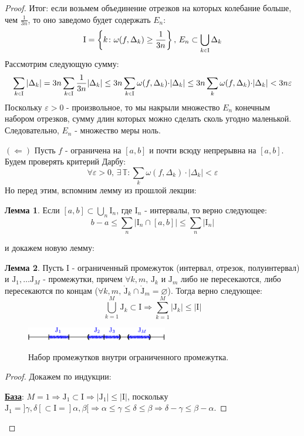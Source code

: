 \documentclass[12pt]{article}
\newcommand{\MTB}{\mathbb{T}}
\newcommand{\MI}{\mathrm{I}}
\newcommand{\MJ}{\mathrm{J}}
\newcommand{\VN}{\varnothing}
\newcommand{\VE}{\varepsilon}
\theoremstyle{definition}
\newtheorem{lemma}{Лемма}
\newcommand{\smallerrel}[1]{\mathrel{\mathpalette\smallerrelaux{#1}}}
\newcommand{\smallerrelaux}[2]{\raisebox{.1ex}{\scalebox{.75}{$#1#2$}}}
\newcommand{\smallin}{\smallerrel{\in}}
\begin{document}
\begin{proof}
	Итог: если возьмем объединение отрезков на которых колебание больше, чем $\tfrac{1}{3n}$, то оно заведомо будет содержать $E_n$:
	$$
		\MI = \left\{k\colon \omega(f,\Delta_k) \geq \dfrac{1}{3n}\right\}, \, E_n \subset \bigcup\limits_{k\smallin \MI}\Delta_k
	$$
	Рассмотрим следующую сумму:
	$$
		\sum\limits_{k \smallin \MI}|\Delta_k| = 3n \sum\limits_{k \smallin \MI}\dfrac{1}{3n}|\Delta_k| \leq 3n \sum\limits_{k \smallin \MI}\omega(f,\Delta_k){\cdot}|\Delta_k| \leq 3n \sum\limits_{k }\omega(f,\Delta_k){\cdot}|\Delta_k| < 3n\VE
	$$
	Поскольку $\VE > 0$ - произвольное, то мы накрыли множество $E_n$ конечным набором отрезков, сумму длин которых можно сделать сколь угодно маленькой. Следовательно, $E_n$ - множество меры ноль.
	
	$(\Leftarrow)$ Пусть $f$ - ограничена на $[a,b]$ и почти всюду непрерывна на $[a,b]$. Будем проверять критерий Дарбу:
	$$
		\forall \VE > 0, \, \exists \, \MTB \colon \sum\limits_{k}\omega(f,\Delta_k){\cdot}|\Delta_k| < \VE
	$$
	Но перед этим, вспомним лемму из прошлой лекции:
	\begin{lemma}
		Если $[a,b] \subset \displaystyle \bigcup\limits_n \MI_n$, где $\MI_n$ - интервалы, то верно следующее: 
		$$
			b - a \leq \displaystyle \sum\limits_n |\MI_n \cap [a,b]| \leq \displaystyle \sum\limits_n |\MI_n|
		$$	
	\end{lemma}
	и докажем новую лемму:
	\begin{lemma}
		Пусть $\MI$ - ограниченный промежуток (интервал, отрезок, полуинтервал) и $\MJ_1, \dotsc \MJ_M$ - промежутки, причем $\forall k,m, \, \MJ_k$ и $\MJ_m$ либо не пересекаются, либо пересекаются по концам ($\forall k,m , \, \mathring{\MJ}_k \cap \mathring{\MJ}_m = \VN$). Тогда верно следующее: 
		$$
			\displaystyle \bigcup\limits_{k = 1}^M \MJ_k \subset \MI \Rightarrow \sum\limits_{k = 1}^M|\MJ_k| \leq |\MI|
		$$
	\end{lemma}
	\begin{figure}[H]
		\centering
		\includegraphics[width=0.55\textwidth]{25_1.eps}
		\label{25_1}
		\caption{Набор промежутков внутри ограниченного промежутка.}
		\label{fig:Ограниченный промежуток}
	\end{figure}
	\begin{proof}
		Докажем по индукции:
		
		\textbf{\uline{База}}: $M = 1 \Rightarrow \MJ_1 \subset \MI \Rightarrow |\MJ_1| \leq |\MI|$, поскольку $\MJ_1 = ]\gamma,\delta[ \subset \MI = ]\alpha,\beta[ \Rightarrow \alpha \leq \gamma \leq \delta \leq \beta \Rightarrow \delta - \gamma \leq \beta - \alpha$.
		

\end{proof}
\end{proof}
\end{document}

